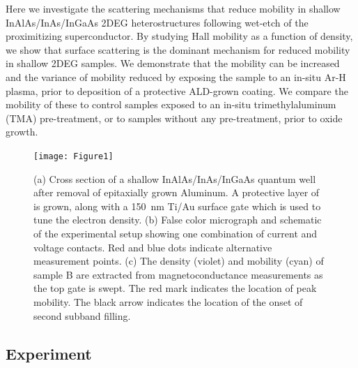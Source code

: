 Here we investigate the scattering mechanisms that reduce mobility in shallow InAlAs/InAs/InGaAs 2DEG heterostructures following wet-etch of the proximitizing superconductor. By studying Hall mobility as a function of density, we show that surface scattering is the dominant mechanism for reduced mobility in shallow 2DEG samples. We demonstrate that the mobility can be increased and the variance of mobility reduced by exposing the sample to an in-situ Ar-H plasma, prior to deposition of a protective ALD-grown  coating. We compare the mobility of these to control samples exposed to an in-situ trimethylaluminum (TMA) pre-treatment, or to samples without any pre-treatment, prior to oxide growth.

\begin{figure}
\texttt{[image: Figure1]}
\caption[InAs sample details and experimental setup]{\label{fig:surf_fig1} (a) Cross section of a shallow InAlAs/InAs/InGaAs quantum well after removal of epitaxially grown Aluminum. A protective layer of  is grown, along with a \SI{150}{\nano\meter} Ti/Au surface gate which is used to tune the electron density. (b) False color micrograph and schematic of the experimental setup showing one combination of current and voltage contacts. Red and blue dots indicate alternative measurement points. (c) The density (violet) and mobility (cyan) of sample B are extracted from magnetoconductance measurements as the top gate is swept. The red mark indicates the location of peak mobility. The black arrow indicates the location of the onset of second subband filling.}
\end{figure}

\subsection{\label{sec:surf_exp}Experiment}

